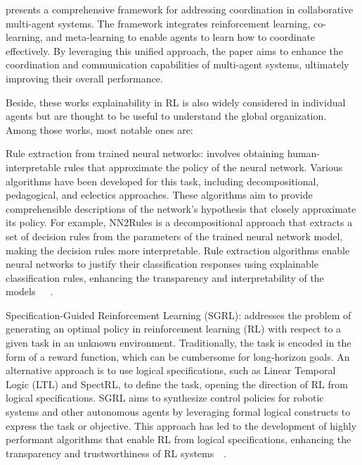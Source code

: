 \documentclass{ecai}
\begin{document}
\citep{Tosic2010} presents a comprehensive framework for addressing coordination in collaborative multi-agent systems. The framework integrates reinforcement learning, co-learning, and meta-learning to enable agents to learn how to coordinate effectively. By leveraging this unified approach, the paper aims to enhance the coordination and communication capabilities of multi-agent systems, ultimately improving their overall performance.

Beside, these works explainability in RL is also widely considered in individual agents but are thought to be useful to understand the global organization. Among those works, most notable ones are:

Rule extraction from trained neural networks: involves obtaining human-interpretable rules that approximate the policy of the neural network. Various algorithms have been developed for this task, including decompositional, pedagogical, and eclectics approaches. These algorithms aim to provide comprehensible descriptions of the network's hypothesis that closely approximate its policy. For example, NN2Rules is a decompositional approach that extracts a set of decision rules from the parameters of the trained neural network model, making the decision rules more interpretable. Rule extraction algorithms enable neural networks to justify their classification responses using explainable classification rules, enhancing the transparency and interpretability of the models~\citep{Hailesilassie2016}~\citep{Sato2001}~\citep{Lal2022}.

Specification-Guided Reinforcement Learning (SGRL): addresses the problem of generating an optimal policy in reinforcement learning (RL) with respect to a given task in an unknown environment. Traditionally, the task is encoded in the form of a reward function, which can be cumbersome for long-horizon goals. An alternative approach is to use logical specifications, such as Linear Temporal Logic (LTL) and SpectRL, to define the task, opening the direction of RL from logical specifications. SGRL aims to synthesize control policies for robotic systems and other autonomous agents by leveraging formal logical constructs to express the task or objective. This approach has led to the development of highly performant algorithms that enable RL from logical specifications, enhancing the transparency and trustworthiness of RL systems~\citep{Bansal2022}~\citep{Jothimurugan2023}.
\end{document}
